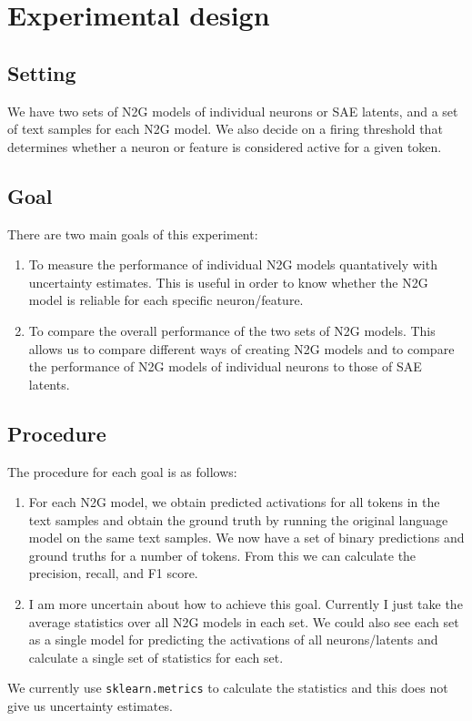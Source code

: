 \documentclass[main.tex]{subfiles}
\begin{document}
\section{Experimental design}
\subsection{Setting}
We have two sets of N2G models of individual neurons or SAE latents, 
and a set of text samples for each N2G model.
We also decide on a firing threshold that determines 
whether a neuron or feature is considered active for a given token.
\subsection{Goal}
There are two main goals of this experiment:
\begin{enumerate}
    \item To measure the performance of individual N2G models 
    quantatively with uncertainty estimates.
    This is useful in order to know 
    whether the N2G model is reliable for each specific neuron/feature.
    \item To compare the overall performance of the two sets of N2G models.
    This allows us to compare different ways of creating N2G models 
    and to compare the performance of N2G models of individual neurons 
    to those of SAE latents.
\end{enumerate}
\subsection{Procedure}
The procedure for each goal is as follows:
\begin{enumerate}
    \item For each N2G model, 
    we obtain predicted activations for all tokens in the text samples 
    and obtain the ground truth by running the original language model 
    on the same text samples.
    We now have a set of binary predictions and ground truths 
    for a number of tokens.
    From this we can calculate the precision, recall, and F1 score.
    \item I am more uncertain about how to achieve this goal.
    Currently I just take the average statistics over all N2G models 
    in each set.
    We could also see each set as a single model for predicting 
    the activations of all neurons/latents 
    and calculate a single set of statistics for each set.
\end{enumerate}
We currently use \verb|sklearn.metrics| to calculate the statistics 
and this does not give us uncertainty estimates.
\end{document}
